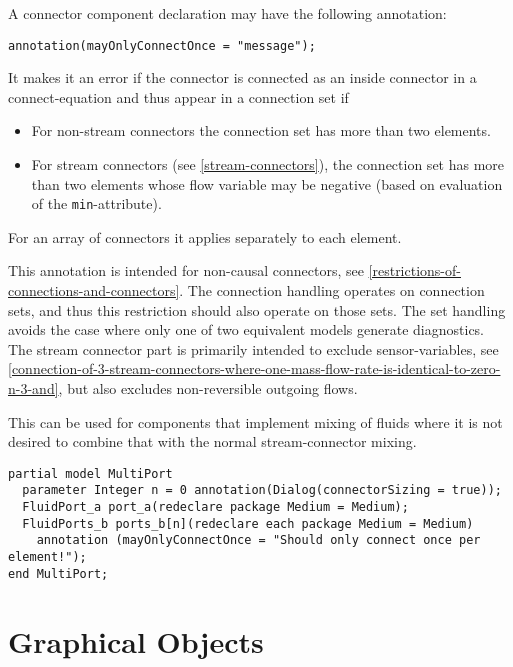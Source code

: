 A connector component declaration may have the following annotation:
\begin{lstlisting}[language=modelica]
annotation(mayOnlyConnectOnce = "message");
\end{lstlisting}%

It makes it an error if the connector is connected as an inside connector in a connect-equation and thus appear in a connection set if
\begin{itemize}
\item For non-stream connectors the connection set has more than two elements.
\item For stream connectors (see \cref{stream-connectors}), the connection set has more than two elements whose flow variable may be negative (based on evaluation of the \lstinline!min!-attribute).
\end{itemize}
For an array of connectors it applies separately to each element.

\begin{nonnormative}
This annotation is intended for non-causal connectors, see \cref{restrictions-of-connections-and-connectors}.
The connection handling operates on connection sets, and thus this restriction should also operate on those sets.
The set handling avoids the case where only one of two equivalent models generate diagnostics.
The stream connector part is primarily intended to exclude sensor-variables, see \cref{connection-of-3-stream-connectors-where-one-mass-flow-rate-is-identical-to-zero-n-3-and}, but also excludes non-reversible outgoing flows.
\end{nonnormative}

\begin{example}
This can be used for components that implement mixing of fluids where it is not desired to combine that with the normal stream-connector mixing.
\begin{lstlisting}[language=modelica]
partial model MultiPort
  parameter Integer n = 0 annotation(Dialog(connectorSizing = true));
  FluidPort_a port_a(redeclare package Medium = Medium);
  FluidPorts_b ports_b[n](redeclare each package Medium = Medium)
    annotation (mayOnlyConnectOnce = "Should only connect once per element!");
end MultiPort;
\end{lstlisting}
\end{example}

\section{Graphical Objects}\label{annotations-for-graphical-objects}\label{graphical-objects}

